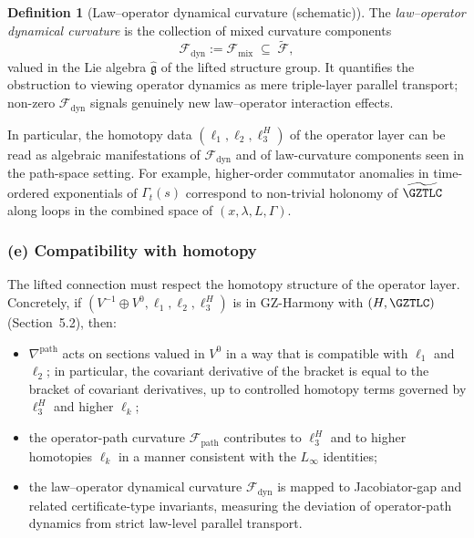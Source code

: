 \documentclass[11pt]{book}
\theoremstyle{plain}
\theoremstyle{definition}
\newtheorem{definition}[theorem]{Definition} \theoremstyle{remark}
\begin{document}
\begin{definition}[Law–operator dynamical curvature (schematic)]
The \emph{law–operator dynamical curvature} is the collection of
  mixed curvature components
  \[
     \mathcal{F}_{\mathrm{dyn}}
     :=
     \mathcal{F}_{\mathrm{mix}}
     \;\subseteq\;
     \widetilde{\mathcal{F}},
  \]
  valued in the Lie algebra $\widehat{\mathfrak{g}}$ of the lifted
  structure group. It quantifies the obstruction to viewing operator
  dynamics as mere triple-layer parallel transport; non-zero
  $\mathcal{F}_{\mathrm{dyn}}$ signals genuinely new law–operator
  interaction effects.
\end{definition}

In particular, the homotopy data $(\ell_1,\ell_2,\ell_3^H)$ of the
operator layer can be read as algebraic manifestations of
$\mathcal{F}_{\mathrm{dyn}}$ and of law-curvature components seen in
the path-space setting. For example, higher-order commutator anomalies
in time-ordered exponentials of $\Gamma_t(s)$ correspond to non-trivial
holonomy of $\widetilde{\GZTLC}$ along loops in the combined space of
$(x,\lambda,L,\Gamma)$.



\subsubsection*{(e) Compatibility with homotopy \texorpdfstring{\GAlgebra}{G-Algebra}}

The lifted connection must respect the homotopy structure of the
operator layer. Concretely, if $(V^{-1}\oplus V^0,\ell_1,\ell_2,\ell_3^H)$
is in GZ-Harmony with $(H,\GZTLC)$ (Section~5.2), then:

\begin{itemize}
  \item $\nabla^{\mathrm{path}}$ acts on sections valued in $V^0$ in a
        way that is compatible with $\ell_1$ and $\ell_2$; in
        particular, the covariant derivative of the bracket is equal
        to the bracket of covariant derivatives, up to controlled
        homotopy terms governed by $\ell_3^H$ and higher $\ell_k$;
  \item the operator-path curvature $\mathcal{F}_{\mathrm{path}}$
        contributes to $\ell_3^H$ and to higher homotopies $\ell_k$
        in a manner consistent with the $L_\infty$ identities;
  \item the law–operator dynamical curvature
        $\mathcal{F}_{\mathrm{dyn}}$ is mapped to Jacobiator-gap and
        related certificate-type invariants, measuring the deviation
        of operator-path dynamics from strict law-level parallel
        transport.
\end{itemize}
\end{document}
